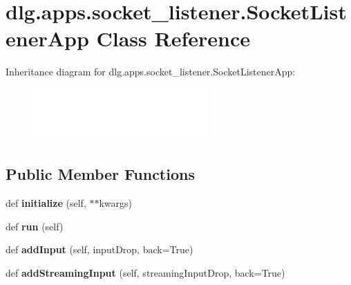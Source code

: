 \hypertarget{classdlg_1_1apps_1_1socket__listener_1_1_socket_listener_app}{}\section{dlg.\+apps.\+socket\+\_\+listener.\+Socket\+Listener\+App Class Reference}
\label{classdlg_1_1apps_1_1socket__listener_1_1_socket_listener_app}
Inheritance diagram for dlg.\+apps.\+socket\+\_\+listener.\+Socket\+Listener\+App\+:\begin{figure}[H]
\begin{center}
\leavevmode
\includegraphics[height=2.000000cm]{classdlg_1_1apps_1_1socket__listener_1_1_socket_listener_app}
\end{center}
\end{figure}
\subsection*{Public Member Functions}
\begin{DoxyCompactItemize}
\item 
\mbox{\label{classdlg_1_1apps_1_1socket__listener_1_1_socket_listener_app_ac51d5f39d2979c7734142ffd29e2c6d3}} 
def {\bfseries initialize} (self, $\ast$$\ast$kwargs)
\item 
\mbox{\label{classdlg_1_1apps_1_1socket__listener_1_1_socket_listener_app_a20a9985907fa77599274f446e6f7503b}} 
def {\bfseries run} (self)
\item 
\mbox{\label{classdlg_1_1apps_1_1socket__listener_1_1_socket_listener_app_ade9f89f8bf21b5b01896a0a706277903}} 
def {\bfseries add\+Input} (self, input\+Drop, back=True)
\item 
\mbox{\label{classdlg_1_1apps_1_1socket__listener_1_1_socket_listener_app_a3fc0b151126c96501f45aa27237a8a91}} 
def {\bfseries add\+Streaming\+Input} (self, streaming\+Input\+Drop, back=True)
\end{DoxyCompactItemize}

